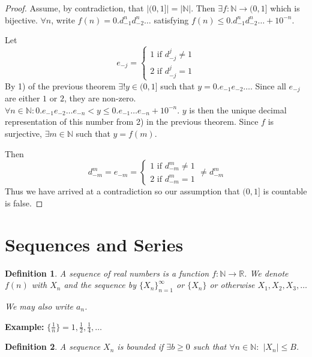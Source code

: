 \documentclass[12pt]{article}
\newtheorem{definition}{Definition}
\begin{document}
\begin{proof}
    Assume, by contradiction, that \(|(0,1]| = |\mathbb N|\). 
    Then \(\exists f: \mathbb N \to (0,1]\) which is bijective.
    \(\forall n\), write \(f(n) = 0.d_{-1}^nd_{-2}^n\dots\) satisfying 
    \(f(n) \leq 0.d_{-1}^nd_{-2}^n\dots + 10^{-n}\).

    \noindent
    Let \[e_ {-j} = 
    \begin{cases}
        1 \text{ if } d_{-j}^j \neq 1 \\
        2 \text{ if } d_{-j}^j = 1
    \end{cases}
    \]
    By 1) of the previous theorem \(\exists!y \in (0,1] \) such that 
    \(y = 0.e_{-1}e_{-2}\dots\). Since all \(e_{-j}\) are either \(1\) or \(2\), 
    they are non-zero.
    \(\forall n\in \mathbb N : 0.e_{-1}e_{-2}\dots e_{-n} < y \leq 0.e_{-1}
    \dots e_{-n} + 10^{-n}\). 
    \(y\) is then the unique decimal representation of this number from 2) in the 
    previous theorem. Since \(f\) is surjective, \(\exists m \in \mathbb N\)
    such that \(y = f(m)\). 

    \noindent
    Then 
    \[d_{-m}^m = e_{-m} = 
    \begin{cases}
        1 \text{ if } d_{-m}^m \neq 1 \\ 
        2 \text{ if } d_{-m}^m = 1
    \end{cases}
    \neq d_{-m}^m
    \] 
    Thus we have arrived at a contradiction so our assumption that \((0,1]\) is 
    countable is false.
\end{proof}

\section*{Sequences and Series}
\begin{definition}
    A sequence of real numbers is a function \(f: \mathbb N \to \mathbb R\). 
    We denote \(f(n)\) with \(X_n\) and the sequence by \(\{X_n\}_{n=1}^\infty\)
    or \(\{X_n\}\) or otherwise \(X_1,X_2,X_3,\dots\)

    \noindent 
    We may also write \(a_n\).
\end{definition}

\noindent 
\textbf{Example:} \(\{\frac{1}{n}\} = 1, \frac{1}{2}, \frac{1}{4}, \dots\)
\begin{definition}
    A sequence \(X_n\) is bounded if \(\exists b \geq 0\) such that 
    \(\forall n \in \mathbb N:\) \(|X_n| \leq B\).
\end{definition}
\end{document}
